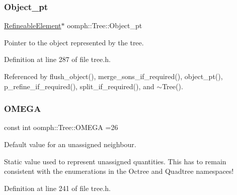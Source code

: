 \subsubsection{\texorpdfstring{Object\+\_\+pt}{Object\_pt}}
{\footnotesize\ttfamily \hyperlink{classoomph_1_1RefineableElement}{Refineable\+Element}$\ast$ oomph\+::\+Tree\+::\+Object\+\_\+pt\hspace{0.3cm}{\ttfamily [protected]}}



Pointer to the object represented by the tree. 



Definition at line 287 of file tree.\+h.



Referenced by flush\+\_\+object(), merge\+\_\+sons\+\_\+if\+\_\+required(), object\+\_\+pt(), p\+\_\+refine\+\_\+if\+\_\+required(), split\+\_\+if\+\_\+required(), and $\sim$\+Tree().

\mbox{\label{classoomph_1_1Tree_a9e532196340dcd859ff8207eea2ddbbc}} 
\subsubsection{\texorpdfstring{O\+M\+E\+GA}{OMEGA}}
{\footnotesize\ttfamily const int oomph\+::\+Tree\+::\+O\+M\+E\+GA =26\hspace{0.3cm}{\ttfamily [static]}}



Default value for an unassigned neighbour. 

Static value used to represent unassigned quantities. This has to remain consistent with the enumerations in the Octree and Quadtree namespaces! 

Definition at line 241 of file tree.\+h.



